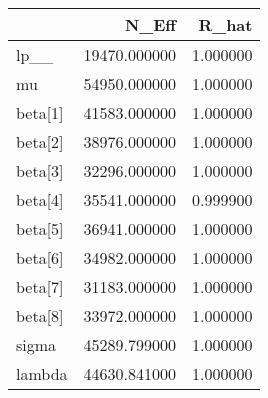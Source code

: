 \begin{tabular}{lrr}
\toprule
 & N_Eff & R_hat \\
\midrule
lp__ & 19470.000000 & 1.000000 \\
mu & 54950.000000 & 1.000000 \\
beta[1] & 41583.000000 & 1.000000 \\
beta[2] & 38976.000000 & 1.000000 \\
beta[3] & 32296.000000 & 1.000000 \\
beta[4] & 35541.000000 & 0.999900 \\
beta[5] & 36941.000000 & 1.000000 \\
beta[6] & 34982.000000 & 1.000000 \\
beta[7] & 31183.000000 & 1.000000 \\
beta[8] & 33972.000000 & 1.000000 \\
sigma & 45289.799000 & 1.000000 \\
lambda & 44630.841000 & 1.000000 \\
\bottomrule
\end{tabular}
